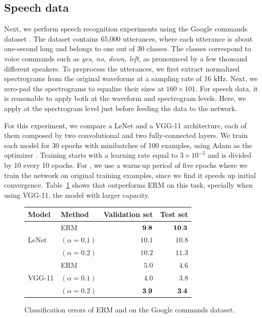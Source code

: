\subsection{Speech data}
\label{sec:speech}
Next, we perform speech recognition experiments using the Google commands
dataset \citep{commands}. The dataset contains 65,000 utterances, where each
utterance is about one-second long and belongs to one out of 30 classes. The
classes correspond to voice commands such as \emph{yes, no, down, left}, as
pronounced by a few thousand different speakers. To preprocess the utterances,
we first extract normalized spectrograms from the original waveforms at a
sampling rate of 16 kHz. Next, we zero-pad the spectrograms to equalize their
sizes at $160 \times 101$. For speech data, it is reasonable to apply \mixup{}
both at the waveform and spectrogram levels. Here, we apply \mixup{} at the
spectrogram level just before feeding the data to the network.

For this experiment, we compare a LeNet \citep{lecun98} and a VGG-11
\citep{simonyan2014very} architecture, each of them composed by two
convolutional and two fully-connected layers. We train each model for 30 epochs
with minibatches of 100 examples, using Adam as the optimizer
\citep{kingma2014adam}. Training starts with a learning rate equal to
$3\times10^{-3}$ and is divided by 10 every 10 epochs.  For \mixup{}, we use a
warm-up period of five epochs where we train the network on original training
examples, since we find it speeds up initial convergence.
Table~\ref{fig:speech_results} shows that \mixup{} outperforms ERM on this
task, specially when using VGG-11, the model with larger capacity.

\begin{figure}
	\centering
		\begin{tabular}[b]{ll rr }
            \toprule
			Model & Method & Validation set & Test set\\
            \midrule
			\multirow{3}{*}{LeNet}  & ERM                     & $\bf 9.8$ & $\bf  10.3$\\
			                        & \mixup{} $(\alpha=0.1)$ &     $10.1$ &      $10.8$\\
			                        & \mixup{} $(\alpha=0.2)$ &    $10.2$ &      $11.3$\\
			\midrule
			\multirow{3}{*}{VGG-11} & ERM                     &     $5.0$ &      $4.6$\\
			                        & \mixup{} $(\alpha=0.1)$ &     $4.0$ &      $3.8$\\
			                        & \mixup{} $(\alpha=0.2)$ & $\bf 3.9$ &  $\bf 3.4$\\
            \bottomrule
		\end{tabular}
	\caption{Classification errors of ERM and \mixup{} on the Google commands dataset.}
    \label{fig:speech_results}
\end{figure}

